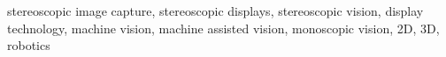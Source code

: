 \documentclass[12pt, journal]{IEEEtran}
\begin{document}
\begin{IEEEkeywords}
stereoscopic image capture, stereoscopic displays, stereoscopic vision, display technology, machine vision, machine assisted vision, monoscopic vision, 2D, 3D, robotics
\end{IEEEkeywords}



%
\IEEEpeerreviewmaketitle



% 
% 
% 
% 



\end{document}
